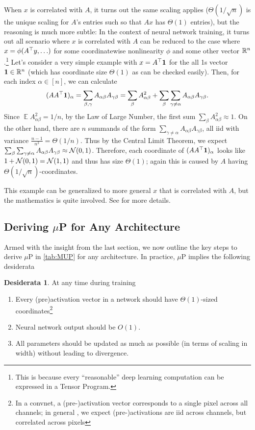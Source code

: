 \documentclass{article}
\theoremstyle{definition}
\newtheorem{des}{Desiderata}[section]
\DeclareMathOperator*{\EV}{\mathbb{E}}
\begin{document}
    When $x$ is correlated with $A$, it turns out the same scaling applies ($\Theta(1/\sqrt{n})$ is the unique scaling for $A$'s entries such so that $Ax$ has $\Theta(1)$ entries), but the reasoning is much more subtle: In the context of neural network training, it turns out all scenario where $x$ is correlated with $A$ can be reduced to the case where $x=\phi(A^{\top}y,\ldots)$ for some coordinatewise nonlinearity $\phi$ and some other vector $\mathbb{R}^{n}$.\footnote{This is because every ``reasonable'' deep learning computation can be expressed in a Tensor Program.} Let's consider a very simple example with $x=A^{\top}\mathbf{1}$ for the all 1s vector $\mathbf{1}\in\mathbb{R}^{n}$ (which has coordinate size $\Theta(1)$ as can be checked easily). Then, for each index $\alpha\in[n]$, we can calculate
    \[
    (AA^{\top}\mathbf{1})_{\alpha}=\sum_{\beta,\gamma}A_{\alpha\beta}A_{\gamma\beta}=\sum_{\beta}A_{\alpha\beta}^{2}+\sum_{\beta}\sum_{\gamma\ne\alpha}A_{\alpha\beta}A_{\gamma\beta}.
    \]
    Since $\EV A_{\alpha\beta}^{2}=1/n$, by the Law of Large Number, the first sum $\sum_{\beta}A_{\alpha\beta}^{2}\approx1$. On the other hand, there are $n$ summands of the form $\sum_{\gamma\ne\alpha}A_{\alpha\beta}A_{\gamma\beta}$, all iid with variance $\frac{n-1}{n^{2}}=\Theta(1/n)$. Thus by the Central Limit Theorem, we expect $\sum_{\beta}\sum_{\gamma\ne\alpha}A_{\alpha\beta}A_{\gamma\beta}\approx\mathcal{N}(0,1)$. Therefore, each coordinate of $(AA^{\top}\mathbf{1})_{\alpha}$ looks like $1+\mathcal{N}(0,1)=\mathcal{N}(1,1)$ and thus has size $\Theta(1)$; again this is caused by $A$ having $\Theta(1/\sqrt{n})$-coordinates.
    
    This example can be generalized to more general $x$ that is correlated with $A$, but the mathematics is quite involved. See \citep{TP3} for more details.
    
    \subsection{Deriving \texorpdfstring{$\mu$P}{MUP} for Any Architecture}
    \label{sec:DeriveMUP}
    
    Armed with the insight from the last section, we now outline the key steps to derive $\mu$P in \cref{tab:MUP} for any architecture. In practice, $\mu$P implies the following desiderata
    \begin{des}
    At any time during training
    \begin{enumerate}
    \item Every (pre)activation vector in a network should have $\Theta(1)$-sized coordinates\label{enu:act1}\footnote{In a convnet, a (pre-)activation vector corresponds to a single pixel across all channels; in general , we expect (pre-)activations are iid across channels, but correlated across pixels}
    \item Neural network output should be $O(1)$.\label{enu:out1}
    \item All parameters should be updated as much as possible (in terms of scaling in width) without leading to divergence.\label{enu:MUP}
    \end{enumerate}
    \end{des}
    
\end{document}

